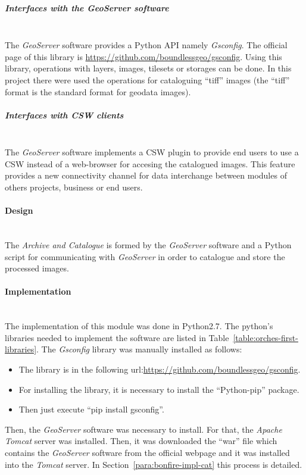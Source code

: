\subparagraph{Interfaces with the GeoServer software}~\\

The \emph{GeoServer} software provides a Python \ac{API} namely
\emph{Gsconfig}. The official page of this library is
\url{https://github.com/boundlessgeo/gsconfig}. Using this library, operations
with layers, images, tilesets or storages can be done. In this project there
were used the operations for cataloguing ``tiff'' images (the ``tiff'' format is
the standard format for geodata images).

\subparagraph{Interfaces with CSW clients}~\\

The \emph{GeoServer} software implements a \ac{CSW} plugin to provide end users
to use a \ac{CSW} instead of a web-browser for accesing the catalogued images.
This feature provides a new connectivity channel for data interchange between
modules of others projects, business or end users.

\paragraph{Design}~\\

The \emph{Archive and Catalogue} is formed by the \emph{GeoServer} software and
a Python script for communicating with \emph{GeoServer} in order to catalogue
and store the processed images.

\paragraph{Implementation}~\\

The implementation of this module was done in Python2.7. The python's libraries
needed to implement the software are listed in Table~\ref{table:orches-first-libraries}.
The \emph{Gsconfig} library was manually installed as follows:
\begin{itemize}
\item The library is in the following
  url:\url{https://github.com/boundlessgeo/gsconfig}.
\item For installing the library, it is necessary to install the ``Python-pip''
  package.
\item Then just execute ``pip install gsconfig''.
\end{itemize}

Then, the \emph{GeoServer} software was necessary to install. For that, the
\emph{Apache Tomcat} server was installed. Then, it was downloaded the ``war''
file which contains the \emph{GeoServer} software from the official webpage and
it was installed into the \emph{Tomcat} server. In Section~\ref{para:bonfire-impl-cat} this process
is detailed. 

